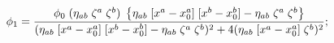 \begin{equation}
\phi_1 = {\phi_0 \; (\eta_{ab} \; \zeta^a \; \zeta^b) \;
\left\{\eta_{ab} \;[x^a-x_0^a] \; [x^b-x_0^b] - \eta_{ab} \; \zeta^a \; \zeta^b \right\}
\over
(\eta_{ab} \;[x^a-x_0^a] \; [x^b-x_0^b] - \eta_{ab} \; \zeta^a \; \zeta^b  )^2 +
4 (\eta_{ab} \;[x^a-x_0^a] \; \zeta^b)^2};
\end{equation}

